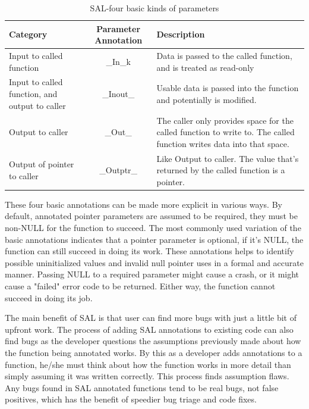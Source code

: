\begin{table}
	\centering
	\begin{tabular}{|l|c|p{5cm}|}
		\hline
		Category  & Parameter Annotation & Description  \\
		\hline
		
		Input to called function        & \_In\_k  		   & Data is passed to the called function, and 
		is treated as read-only\\
		\hline
		
		Input to called function, and output to caller        & \_Inout\_ & Usable data is passed into the function 
		and potentially is modified. \\ \hline
		Output to caller        & \_Out\_ & The caller only provides space 
		for the called function to write to. 
		The called function writes
		data into that space. \\
		\hline
		
		Output of pointer to caller         & \_Outptr\_  & Like Output to caller. The value that's returned by the called function is a pointer.\\ 	\hline
			
	\end{tabular}
	\caption{SAL-four basic kinds of parameters}
	\label{table:four basic kinds of parameters}
\end{table}

These four basic annotations can be made more explicit in various ways. By default, annotated pointer parameters are assumed to be required, they must be non-NULL for the function to succeed. The most commonly used variation of the basic annotations indicates that a pointer parameter is optional, if it's NULL, the function can still succeed in doing its work. These annotations helps to identify possible uninitialized values and invalid null pointer uses in a formal and accurate manner. Passing NULL to a required parameter might cause a crash, or it might cause a "failed" error code to be returned. Either way, the function cannot succeed in doing its job.

The main benefit of SAL is that user can find more bugs with just a little bit of upfront work. The process of adding SAL annotations to existing code can also find bugs as the developer questions the assumptions previously made about how the function being annotated works. By this as a developer adds annotations to a function, he/she must think about how the function works in more detail than simply assuming it was written correctly. This process finds assumption flaws. Any bugs found in SAL annotated functions tend to be real bugs, not false positives, which has the benefit of speedier bug triage and code fixes.

